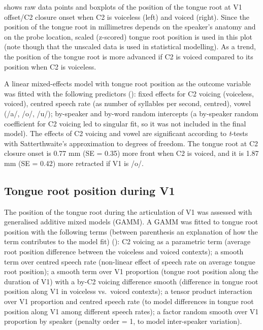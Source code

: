 \documentclass[preprint]{JASAnew}
\begin{document}
 shows raw data points and boxplots of the position of
the tongue root at V1 offset/C2 closure onset when C2 is voiceless
(left) and voiced (right). Since the position of the tongue root in
millimetres depends on the speaker's anatomy and on the probe location,
scaled (z-scored) tongue root position is used in this plot (note though
that the unscaled data is used in statistical modelling). As a trend,
the position of the tongue root is more advanced if C2 is voiced
compared to its position when C2 is voiceless.

A linear mixed-effects model with tongue root position as the outcome
variable was fitted with the following predictors
(): fixed effects for C2 voicing (voiceless,
voiced), centred speech rate (as number of syllables per second,
centred), vowel (/a/, /o/, /u/); by-speaker and by-word random
intercepts (a by-speaker random coefficient for C2 voicing led to
singular fit, so it was not included in the final model). The effects of
C2 voicing and vowel are significant according to \emph{t}-tests with
Satterthwaite's approximation to degrees of freedom. The tongue root at
C2 closure onset is 0.77 mm (SE = 0.35) more front when C2 is voiced,
and it is 1.87 mm (SE = 0.42) more retracted if V1 is /o/.

\hypertarget{tongue-root-position-during-v1}{%
\subsection{Tongue root position during
V1}\label{tongue-root-position-during-v1}}

\label{s:trp-v1}

The position of the tongue root during the articulation of V1 was
assessed with generalised additive mixed models (GAMM). A GAMM was
fitted to tongue root position with the following terms (between
parenthesis an explanation of how the term contributes to the model fit)
(): C2 voicing as a parametric term (average
root position difference between the voiceless and voiced contexts); a
smooth term over centred speech rate (non-linear effect of speech rate
on average tongue root position); a smooth term over V1 proportion
(tongue root position along the duration of V1) with a by-C2 voicing
difference smooth (difference in tongue root position along V1 in
voiceless vs.~voiced contexts); a tensor product interaction over V1
proportion and centred speech rate (to model differences in tongue root
position along V1 among different speech rates); a factor random smooth
over V1 proportion by speaker (penalty order = 1, to model inter-speaker
variation).
\end{document}
